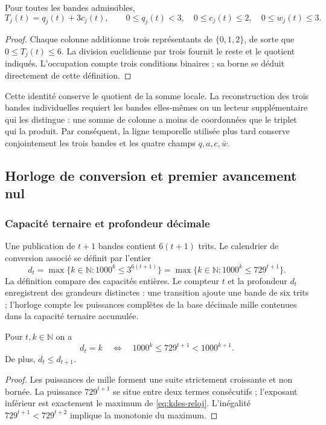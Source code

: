 \begin{proposition}
Pour toutes les bandes admissibles,
\[
 T_j(t)=q_j(t)+3c_j(t),\qquad
 0\leq q_j(t)<3,\quad 0\leq c_j(t)\leq2,
 \quad0\leq w_j(t)\leq3.
\]
\end{proposition}
\begin{proof}
Chaque colonne additionne trois représentants de $\{0,1,2\}$, de sorte que
$0\leq T_j(t)\leq6$. La division euclidienne par trois fournit le reste
et le quotient indiqués. L'occupation compte trois conditions binaires ;
sa borne se déduit directement de cette définition.
\end{proof}

Cette identité conserve le quotient de la somme locale. La reconstruction
des trois bandes individuelles requiert les bandes elles-mêmes ou un lecteur
supplémentaire qui les distingue : une somme de colonne a moins de coordonnées
que le triplet qui la produit. Par conséquent, la ligne temporelle utilisée plus
tard conserve conjointement les trois bandes et les quatre champs
$q,a,c,\bar w$.

\subsection{Horloge de conversion et premier avancement nul}

\subsubsection{Capacité ternaire et profondeur décimale}

Une publication de $t+1$ bandes contient $6(t+1)$ trits. Le calendrier  
de conversion associé se définit par l'entier
\begin{equation}
 d_t=\max\{k\in\mathbb N:1000^k\leq3^{6(t+1)}\}
     =\max\{k\in\mathbb N:1000^k\leq729^{t+1}\}.
 \label{eq:kdes-reloj}
\end{equation}
La définition compare des capacités entières. Le compteur $t$ et la profondeur $d_t$ enregistrent des grandeurs distinctes : une transition ajoute une bande de six trits ; l'horloge compte les puissances complètes de la base décimale mille contenues dans la capacité ternaire accumulée.

\begin{lemma}
Pour $t,k\in\mathbb N$ on a
\[
 d_t=k\quad\Longleftrightarrow\quad
 1000^k\leq729^{t+1}<1000^{k+1}.
\]
De plus, $d_t\leq d_{t+1}$.
\end{lemma}
\begin{proof}
Les puissances de mille forment une suite strictement croissante et non bornée. La puissance $729^{t+1}$ se situe entre deux termes consécutifs ; l'exposant inférieur est exactement le maximum de \eqref{eq:kdes-reloj}. L'inégalité $729^{t+1}<729^{t+2}$ implique la monotonie du maximum.
\end{proof}

